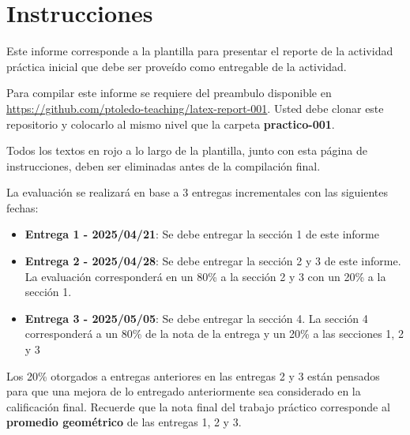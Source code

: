 \documentclass[12pt,letterpaper,twoside]{article}
\begin{document}

{\color{red}
\section*{Instrucciones}
  
Este informe corresponde a la plantilla para presentar el reporte de la actividad práctica inicial que debe ser proveído como entregable de la actividad.

Para compilar este informe se requiere del preambulo disponible en \url{https://github.com/ptoledo-teaching/latex-report-001}. Usted debe clonar este repositorio y colocarlo al mismo nivel que la carpeta \textbf{practico-001}.

Todos los textos en rojo a lo largo de la plantilla, junto con esta página de instrucciones, deben ser eliminadas antes de la compilación final.

La evaluación se realizará en base a 3 entregas incrementales con las siguientes fechas:

\begin{itemize}
    \item \textbf{Entrega 1 - 2025/04/21}: Se debe entregar la sección 1 de este informe
    \item \textbf{Entrega 2 - 2025/04/28}: Se debe entregar la sección 2 y 3 de este informe. La evaluación corresponderá en un 80\% a la sección 2 y 3 con un 20\% a la sección 1.
    \item \textbf{Entrega 3 - 2025/05/05}: Se debe entregar la sección 4. La sección 4 corresponderá a un 80\% de la nota de la entrega y un 20\% a las secciones 1, 2 y 3
\end{itemize}

Los 20\% otorgados a entregas anteriores en las entregas 2 y 3 están pensados para que una mejora de lo entregado anteriormente sea considerado en la calificación final. Recuerde que la nota final del trabajo práctico corresponde al \textbf{promedio geométrico} de las entregas 1, 2 y 3.
\newpage
}

\end{document}
